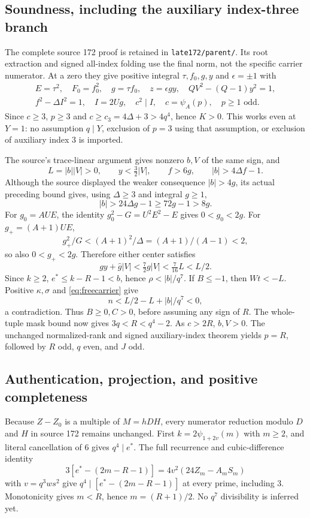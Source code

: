 \subsection{Soundness, including the auxiliary index-three branch}
The complete source 172 proof is retained in \texttt{late172/parent/}.
Its root extraction and signed all-index folding use the final norm,
not the specific carrier numerator. At a zero they give positive integral
$\tau,f_0,g,y$ and $\epsilon=\pm1$ with
\begin{gather*}
 E=\tau^2,\quad F_0=f_0^2,\quad g=\tau f_0,\quad z=\epsilon gy,
 \quad QV^2-(Q-1)y^2=1,\\
 f^2-\Delta I^2=1,\quad I=2Ug,\quad c^2\mid I,
 \quad c=\psi_A(p),\quad p\ge1\text{ odd}.
\end{gather*}
Since $c\ge3$, $p\ge3$ and $c\ge c_3=4\Delta+3>4q^4$, hence $K>0$.
This works even at $Y=1$: no assumption $q\mid Y$, exclusion of $p=3$
using that assumption, or exclusion of auxiliary index 3 is imported.

The source's trace-linear argument gives nonzero $b,V$ of the same sign,
and
\[
 L=|b||V|>0,\qquad y<\tfrac32|V|,\qquad f>6g,
 \qquad |b|>4\Delta f-1.
\]
Although the source displayed the weaker consequence $|b|>4g$, its actual
preceding bound gives, using $\Delta\ge3$ and integral $g\ge1$,
\begin{equation}
 |b|>24\Delta g-1\ge72g-1>8g.\label{eq:strongmargin}
\end{equation}
For $g_0=AUE$, the identity $g_0^2-G=U^2E^2-E$ gives $0<g_0<2g$.
For $g_+=(A+1)UE$,
\[
 g_+^2/G<(A+1)^2/\Delta=(A+1)/(A-1)<2,
\]
so also $0<g_+<2g$. Therefore either center satisfies
\begin{equation}
 gy+\widehat g|V|<\tfrac72g|V|<\tfrac7{16}L<L/2.\label{eq:freemargin}
\end{equation}
Since $k\ge2$, $e^*\le k-R-1<b$, hence $\rho<|b|/q^7$.
If $B\le-1$, then $Wt<-L$. Positive $\kappa,\sigma$ and
\eqref{eq:freecarrier} give
\[
 n<L/2-L+|b|/q^7<0,
\]
a contradiction. Thus $B\ge0,C>0$, before assuming any sign of $R$.
The whole-tuple mask bound now gives $3q<R<q^4-2$. As $c>2R$, $b,V>0$.
The unchanged normalized-rank and signed auxiliary-index theorem yields
$p=R$, followed by $R$ odd, $q$ even, and $J$ odd.

\subsection{Authentication, projection, and positive completeness}
Because $Z-Z_0$ is a multiple of $M=hDH$, every numerator reduction modulo
$D$ and $H$ in source 172 remains unchanged. First
$k=2\psi_{1+2v}(m)$ with $m\ge2$, and literal cancellation of 6 gives
$q^4\mid e^*$. The full recurrence and cubic-difference identity
\[
 3[e^*-(2m-R-1)]=4v^2(24Z_m-A_mS_m)
\]
with $v=q^3ws^2$ give $q^4\mid[e^*-(2m-R-1)]$ at every prime,
including 3. Monotonicity gives $m<R$, hence $m=(R+1)/2$.
No $q^7$ divisibility is inferred yet.


